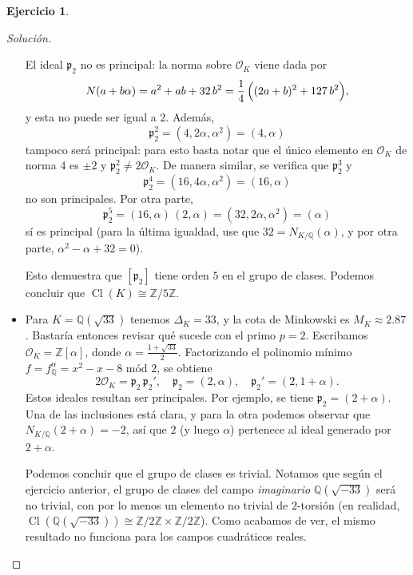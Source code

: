 \documentclass{article}
\newcounter{tarea}
\theoremstyle{definition}
\newtheorem{ejercicio}{Ejercicio}[tarea]
\newenvironment{solucion}{\begin{proof}[Solución]}{\end{proof}}
\DeclareMathOperator{\Cl}{Cl}
\newcommand{\ZZ}{\mathbb{Z}}
\newcommand{\QQ}{\mathbb{Q}}
\renewcommand{\O}{\mathcal{O}}
\begin{document}
\begin{ejercicio}
\begin{solucion}
\begin{itemize}
      El ideal $\mathfrak{p}_2$ no es principal: la norma sobre $\O_K$ viene
      dada por
      \[ N (a + b\alpha) = a^2 + ab + 32\,b^2
        = \frac{1}{4}\,\Bigl((2a + b)^2 + 127\,b^2\Bigr), \]
      y esta no puede ser igual a $2$. Además,
      $$\mathfrak{p}_2^2 = (4, 2\alpha, \alpha^2) = (4, \alpha)$$
      tampoco será principal: para esto basta notar que el único elemento en
      $\O_K$ de norma $4$ es $\pm 2$ y $\mathfrak{p}_2^2 \ne 2\O_K$.
      De manera similar, se verifica que $\mathfrak{p}_2^3$ y
      $$\mathfrak{p}_2^4 = (16, 4\alpha, \alpha^2) = (16, \alpha)$$ no son
      principales. Por otra parte,
      $$\mathfrak{p}_2^5 = (16, \alpha)\,(2, \alpha) = (32, 2\alpha, \alpha^2) = (\alpha)$$
      sí es principal (para la última igualdad, use que
      $32 = N_{K/\QQ} (\alpha)$, y por otra parte,
      $\alpha^2 - \alpha + 32 = 0$).

      Esto demuestra que $[\mathfrak{p}_2]$ tiene orden $5$ en el grupo de
      clases. Podemos concluir que $\Cl (K) \cong \ZZ/5\ZZ$.

    \item Para $K = \QQ (\sqrt{33})$ tenemos $\Delta_K = 33$, y la cota de
      Minkowski es $M_K \approx 2.87$. Bastaría entonces revisar qué sucede con
      el primo $p = 2$. Escribamos
      $\O_K = \ZZ [\alpha]$, donde $\alpha = \frac{1+\sqrt{33}}{2}$.
      Factorizando el polinomio mínimo $f = f^\alpha_\QQ = x^2 - x - 8$
      mód $2$, se obtiene
      \[ 2\O_K = \mathfrak{p}_2\,\mathfrak{p}_2', \quad
        \mathfrak{p}_2 = (2, \alpha), \quad
        \mathfrak{p}_2' = (2, 1 + \alpha). \]
      Estos ideales resultan ser principales. Por ejemplo, se tiene
      $\mathfrak{p}_2 = (2 + \alpha)$. Una de las inclusiones está clara,
      y para la otra podemos observar que $N_{K/\QQ} (2+\alpha) = -2$,
      así que $2$ (y luego $\alpha$) pertenece al ideal generado por
      $2 + \alpha$.

      Podemos concluir que el grupo de clases es trivial. Notamos que según el
      ejercicio anterior, el grupo de clases del campo \emph{imaginario}
      $\QQ (\sqrt{-33})$ será no trivial, con por lo menos un elemento no
      trivial de $2$-torsión (en realidad,
      $\Cl (\QQ(\sqrt{-33})) \cong \ZZ/2\ZZ \times \ZZ/2\ZZ$). Como acabamos de
      ver, el mismo resultado no funciona para los campos cuadráticos reales.


\end{itemize}
\end{solucion}
\end{ejercicio}
\end{document}
